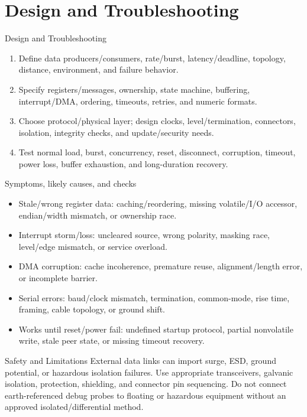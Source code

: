 \documentclass[10pt,letterpaper]{article}
\begin{document}
\section{Design and Troubleshooting}
\begin{CornellExamBox}{Design and Troubleshooting}
\begin{enumerate}
  \item Define data producers/consumers, rate/burst, latency/deadline, topology, distance, environment, and failure behavior.
  \item Specify registers/messages, ownership, state machine, buffering, interrupt/DMA, ordering, timeouts, retries, and numeric formats.
  \item Choose protocol/physical layer; design clocks, level/termination, connectors, isolation, integrity checks, and update/security needs.
  \item Test normal load, burst, concurrency, reset, disconnect, corruption, timeout, power loss, buffer exhaustion, and long-duration recovery.
\end{enumerate}\end{CornellExamBox}
\begin{CornellExamBox}{Symptoms, likely causes, and checks}
\begin{itemize}
  \item Stale/wrong register data: caching/reordering, missing volatile/I/O accessor, endian/width mismatch, or ownership race.
  \item Interrupt storm/loss: uncleared source, wrong polarity, masking race, level/edge mismatch, or service overload.
  \item DMA corruption: cache incoherence, premature reuse, alignment/length error, or incomplete barrier.
  \item Serial errors: baud/clock mismatch, termination, common-mode, rise time, framing, cable topology, or ground shift.
  \item Works until reset/power fail: undefined startup protocol, partial nonvolatile write, stale peer state, or missing timeout recovery.
\end{itemize}\end{CornellExamBox}
\begin{CornellWarningBox}{Safety and Limitations}
External data links can import surge, ESD, ground potential, or hazardous isolation failures. Use appropriate transceivers, galvanic isolation, protection, shielding, and connector pin sequencing. Do not connect earth-referenced debug probes to floating or hazardous equipment without an approved isolated/differential method.
\end{CornellWarningBox}
\end{document}
